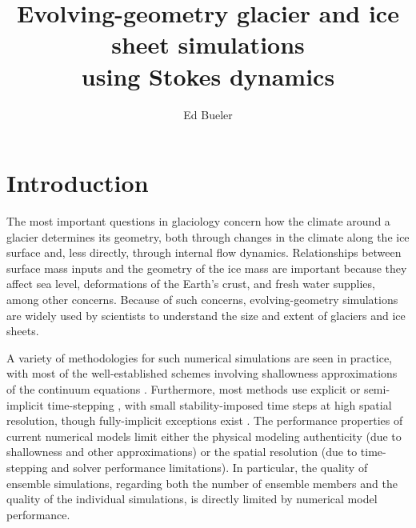 \documentclass[letterpaper,final,12pt,reqno]{amsart}
\begin{document}
\title[Evolving-geometry glacier and ice sheet simulations using Stokes dynamics]{Evolving-geometry glacier and ice sheet simulations \\ using Stokes dynamics}

\author{Ed Bueler}


\maketitle

\thispagestyle{empty}
\bigskip

\section{Introduction} \label{sec:intro}

The most important questions in glaciology concern how the climate around a glacier determines its geometry, both through changes in the climate along the ice surface and, less directly, through internal flow dynamics.  Relationships between surface mass inputs and the geometry of the ice mass are important because they affect sea level, deformations of the Earth's crust, and fresh water supplies, among other concerns.  Because of such concerns, evolving-geometry simulations are widely used by scientists to understand the size and extent of glaciers and ice sheets.

A variety of methodologies for such numerical simulations are seen in practice, with most of the well-established schemes involving shallowness approximations of the continuum equations \cite[for example]{Hoffmanetal2018,Lipscombetal2019,Winkelmannetal2011}.  Furthermore, most methods use explicit or semi-implicit time-stepping \cite{HindmarshPayne1996,Hoffmanetal2018,Lipscombetal2019,Winkelmannetal2011}, with small stability-imposed time steps at high spatial resolution, though fully-implicit exceptions exist \cite{Brinkerhoffetal2017,Bueler2016}.  The performance properties of current numerical models limit either the physical modeling authenticity (due to shallowness and other approximations) or the spatial resolution (due to time-stepping and solver performance limitations).  In particular, the quality of ensemble simulations, regarding both the number of ensemble members and the quality of the individual simulations, is directly limited by numerical model performance.
\end{document}
